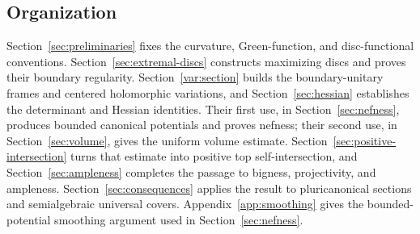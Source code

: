 \subsection{Organization}

Section~\ref{sec:preliminaries} fixes the curvature, Green-function,
and disc-functional conventions. Section~\ref{sec:extremal-discs}
constructs maximizing discs and proves their boundary regularity.
Section~\ref{var:section} builds the boundary-unitary frames and
centered holomorphic variations, and Section~\ref{sec:hessian}
establishes the determinant and Hessian identities. Their first use,
in Section~\ref{sec:nefness}, produces bounded canonical potentials
and proves nefness; their second use, in Section~\ref{sec:volume},
gives the uniform volume estimate. Section~\ref{sec:positive-intersection}
turns that estimate into positive top self-intersection, and
Section~\ref{sec:ampleness} completes the passage to bigness,
projectivity, and ampleness. Section~\ref{sec:consequences} applies the
result to pluricanonical sections and semialgebraic universal covers.
Appendix~\ref{app:smoothing} gives the bounded-potential smoothing
argument used in Section~\ref{sec:nefness}.
